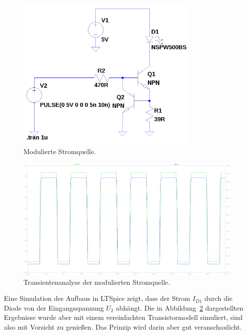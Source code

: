 \documentclass[12pt,a4paper]{article}
\begin{document}
\begin{figure}[!h]
  \centering
    \includegraphics[width=0.8\textwidth]{../spice/modulated_current_source.png}
  \caption{Modulierte Stromquelle.}
  \label{fig:modulated_current_source}
\end{figure}

\begin{figure}[!h]
  \centering
    \includegraphics[width=1.0\textwidth]{../spice/current_input_v_current_out_trans.png}
  \caption{Transientenanalyse der modulierten Stromquelle.}
  \label{fig:modulated_current_source_plot}
\end{figure}


Eine Simulation des Aufbaus in LTSpice zeigt, dass der Strom $I_{D1}$ durch die Diode von der Eingangsspannung $U_2$ abhängt. Die in Abbildung~\ref{fig:modulated_current_source_plot} dargestellten Ergebnisse wurde aber mit einem vereinfachten Transistormodell simuliert, sind also mit Vorsicht zu genießen. Das Prinzip wird darin aber gut veranschaulicht.
\end{document}
